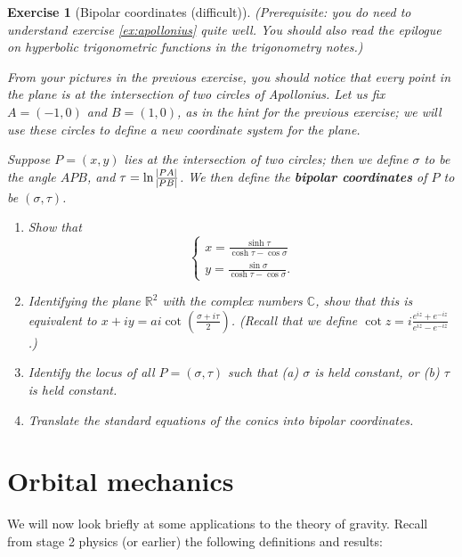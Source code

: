\documentclass[a4paper,leqno,10pt]{article}
\theoremstyle{exercise}
\newtheorem{Exercise}{Exercise}
\newenvironment{exercise}
  {\begin{mdframed}\begin{Exercise}}
  {\end{Exercise}\end{mdframed}}
\theoremstyle{plain}
\theoremstyle{definition}
\theoremstyle{remark}
\newcommand{\df}{\textbf}
\begin{document}
\begin{exercise}[Bipolar coordinates (difficult)]
  (Prerequisite: you do need to understand exercise \ref{ex:apollonius} quite well. You should also read the epilogue on hyperbolic trigonometric
  functions in the trigonometry notes.)

  From your pictures in the previous exercise, you should notice that every point in the plane is at the intersection of two circles of Apollonius.
  Let us fix $ A = (-1, 0) $ and $ B = (1,0) $, as in the hint for the previous exercise; we will use these circles to define a new coordinate system
  for the plane.

  Suppose $ P = (x,y) $ lies at the intersection of two circles; then we define $ \sigma $ to be the angle $ APB $, and $ \tau = \ln \frac{\abs{PA}}{\abs{PB}} $.
  We then define the \df{bipolar coordinates} of $ P $ to be $ (\sigma, \tau) $.
  \begin{enumerate}
    \item Show that
          \begin{displaymath}
            \begin{cases}
              x = \frac{\sinh \tau}{\cosh \tau - \cos \sigma}\\
              y = \frac{\sin \sigma}{\cosh \tau - \cos \sigma}.
            \end{cases}
          \end{displaymath}
    \item Identifying the plane $ \mathbb{R}^2 $ with the complex numbers $ \mathbb{C} $, show that this is
          equivalent to $ x + iy = ai \cot \left(\frac{\sigma + i\tau}{2}\right) $. (Recall that we define $ \cot z = i\frac{e^{iz} + e^{-iz}}{e^{iz} - e^{-iz}} $.)
    \item Identify the locus of all $ P = (\sigma, \tau) $ such that (a) $ \sigma $ is held constant, or (b) $ \tau $ is held constant.
    \item Translate the standard equations of the conics into bipolar coordinates.
  \end{enumerate}
\end{exercise}

\section{Orbital mechanics}
We will now look briefly at some applications to the theory of gravity. Recall from stage 2 physics (or earlier)
the following definitions and results:
\end{document}
